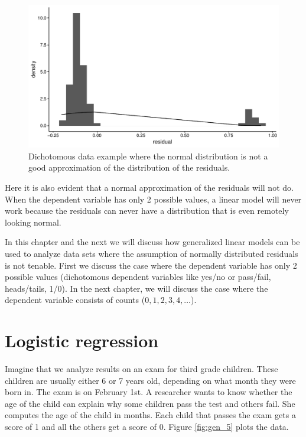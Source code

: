 \documentclass[]{book}\usepackage[]{graphicx}\usepackage[]{color}
\makeatletter
\def\maxwidth{ %
  \ifdim\Gin@nat@width>\linewidth
    \linewidth
  \else
    \Gin@nat@width
  \fi
}
\newenvironment{knitrout}{}{} %
\makeatother
\begin{document}
\begin{knitrout}
\color{fgcolor}\begin{figure}

{\centering \includegraphics[width=\maxwidth]{figure/gen_4-1} 

}

\caption[Dichotomous data example where the normal distribution is not a good approximation of the distribution of the residuals]{Dichotomous data example where the normal distribution is not a good approximation of the distribution of the residuals.}\label{fig:gen_4}
\end{figure}


\end{knitrout}
% 
% 
Here it is also evident that a normal approximation of the residuals will not do. When the dependent variable has only 2 possible values, a linear model will never work because the residuals can never have a distribution that is even remotely looking normal.

In this chapter and the next we will discuss how generalized linear models can be used to analyze data sets where the assumption of normally distributed residuals is not tenable. First we discuss the case where the dependent variable has only 2 possible values (dichotomous dependent variables like yes/no or pass/fail, heads/tails, 1/0). In the next chapter, we will discuss the case where the dependent variable consists of counts ($0, 1, 2, 3, 4, \dots$).


\section{Logistic regression}

Imagine that we analyze results on an exam for third grade children. These children are usually either 6 or 7 years old, depending on what month they were born in. The exam is on February 1st. A researcher wants to know whether the age of the child can explain why some children pass the test and others fail. She computes the age of the child in months. Each child that passes the exam gets a score of 1 and all the others get a score of 0. Figure \ref{fig:gen_5} plots the data.
\end{document}
